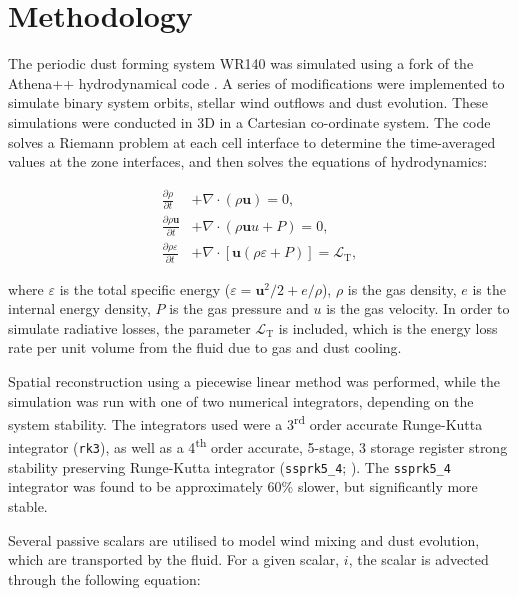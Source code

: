 \documentclass[fleqn,usenatbib]{mnras}
\newcommand{\ts}{\textsuperscript}
\newcommand{\rms}[1]{\ensuremath{_{\text{#1}}}}
\begin{document}
\section{Methodology}
\label{sec:paper-2-methodology}

The periodic dust forming system WR140 was simulated using a fork of the Athena++ hydrodynamical code \citep{stoneAthenaAdaptiveMesh2020}.
A series of modifications were implemented to simulate binary system orbits, stellar wind outflows and dust evolution.
These simulations were conducted in 3D in a Cartesian co-ordinate system.
The code solves a Riemann problem at each cell interface to determine the time-averaged values at the zone interfaces, and then solves the equations of hydrodynamics:

\begin{subequations}
  \begin{align}
    \frac{\partial\rho}{\partial t} & +\nabla \cdot \left(\rho \boldsymbol{u}\right) = 0 , \\
    \frac{\partial \rho \boldsymbol{u}}{\partial t} & + \nabla \cdot \left(\rho \boldsymbol{u} u + P \right) = 0, \\
    \frac{\partial \rho \varepsilon}{\partial t} & + \nabla \cdot \left[ \boldsymbol{u} \left( \rho\varepsilon + P \right) \right] = \mathcal{L}\rms{T} , 
  \end{align}
\end{subequations}

\noindent
where $\varepsilon$ is the total specific energy ($\varepsilon = \boldsymbol{u}^2/2 + e/\rho $), $\rho$ is the gas density, $e$ is the internal energy density, $P$ is the gas pressure and $u$ is the gas velocity.
In order to simulate radiative losses, the parameter $\mathcal{L}\rms{T}$ is included, which is the energy loss rate per unit volume from the fluid due to gas and dust cooling.

Spatial reconstruction using a piecewise linear method was performed, while the simulation was run with one of two numerical integrators, depending on the system stability.
The integrators used were a 3\ts{rd} order accurate Runge-Kutta integrator (\texttt{rk3}), as well as a 4\ts{th} order accurate, 5-stage, 3 storage register strong stability preserving Runge-Kutta integrator (\texttt{ssprk5\_4}; \citet{ruuthHighOrderStrongStabilityPreservingRungeKutta2005}).
The \texttt{ssprk5\_4} integrator was found to be approximately 60\% slower, but significantly more stable.

Several passive scalars are utilised to model wind mixing and dust evolution, which are transported by the fluid.
For a given scalar, $i$, the scalar is advected through the following equation:
\end{document}
